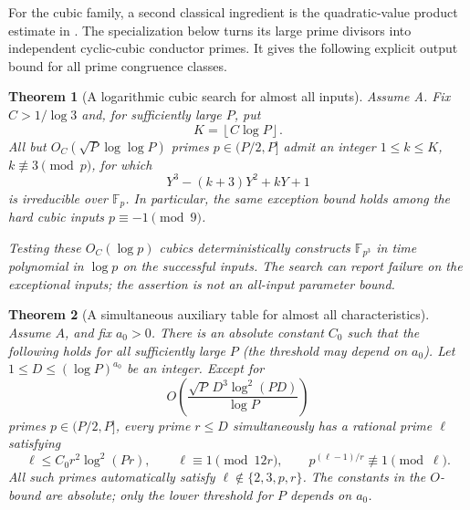 \documentclass[11pt]{article}
\newtheorem{theorem}{Theorem}[section]
\theoremstyle{definition}
\theoremstyle{remark}
\begin{document}
For the cubic family, a second classical ingredient is the quadratic-value product estimate in \citet[Lemmas~1, 3, and 4 and \S2.4, pp.~1131--1134]{Cilleruelo2011}. The specialization below turns its large prime divisors into independent cyclic-cubic conductor primes. It gives the following explicit output bound for all prime congruence classes.

\begin{theorem}[A logarithmic cubic search for almost all inputs]
\label{thm:almost-all-small-tate}
Assume A.  Fix $C>1/\log3$ and, for sufficiently large $P$, put
\[
 K=\left\lfloor C\log P\right\rfloor.
\]
All but $O_C(\sqrt P\log\log P)$ primes $p\in(P/2,P]$
admit an integer $1\le k\le K$, $k\not\equiv3\pmod p$,
for which
\[
 Y^3-(k+3)Y^2+kY+1
\]
is irreducible over $\mathbb F_p$.  In particular, the same
exception bound holds among the hard cubic inputs
$p\equiv-1\pmod9$.

Testing these $O_C(\log p)$ cubics deterministically constructs
$\mathbb F_{p^3}$ in time polynomial in $\log p$ on the
successful inputs.  The search can report failure on the
exceptional inputs; the assertion is not an all-input parameter
bound.
\end{theorem}

\begin{theorem}[A simultaneous auxiliary table for almost all characteristics]\label{thm:aa-12r}
Assume \(A\), and fix \(a_0>0\). There is an absolute constant \(C_0\)
such that the following holds for all sufficiently large \(P\)
(the threshold may depend on \(a_0\)).
Let \(1\leq D\leq(\log P)^{a_0}\) be an integer.
Except for
\begin{equation}\label{eq:aa-12r-exceptions}
 O\!\left(
       \frac{\sqrt P\,D^3\log^2(PD)}{\log P}
    \right)
\end{equation}
primes \(p\in(P/2,P]\), every prime \(r\leq D\) simultaneously has
a rational prime \(\ell\) satisfying
\begin{equation}\label{eq:aa-12r-aux}
 \ell\leq C_0r^2\log^2(Pr),\qquad
 \ell\equiv1\pmod{12r},\qquad
 p^{(\ell-1)/r}\not\equiv1\pmod\ell.
\end{equation}
All such primes automatically satisfy
\(\ell\notin\{2,3,p,r\}\).
The constants in the \(O\)-bound are absolute; only the lower
threshold for \(P\) depends on \(a_0\).
\end{theorem}
\end{document}
